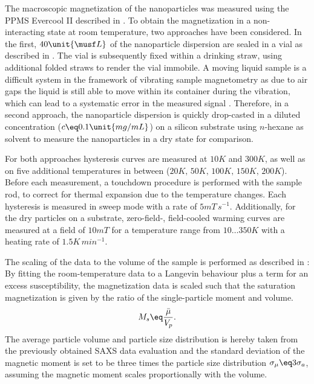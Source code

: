 \documentclass[\main/dresen_thesis.tex]{subfiles}
\begin{document}
    The macroscopic magnetization of the nanoparticles was measured using the PPMS Evercool II described in .
    To obtain the magnetization in a non-interacting state at room temperature, two approaches have been considered.
    In the first, $40 \unit{\musf L}$ of the nanoparticle dispersion are sealed in a vial as described in .
    The vial is subsequently fixed within a drinking straw, using additional folded straws to render the vial immobile.
    A moving liquid sample is a difficult system in the framework of vibrating sample magnetometry as due to air gaps the liquid is still able to move within its container during the vibration, which can lead to a systematic error in the measured signal \cite{Boekelheide_2016_Artif}.
    Therefore, in a second approach, the nanoparticle dispersion is quickly drop-casted in a diluted concentration ($c \eq 0.1 \unit{mg/mL}$) on a silicon substrate using $\textit{n}$-hexane as solvent to measure the nanoparticles in a dry state for comparison.

    For both approaches hysteresis curves are measured at $10 \unit{K}$ and $300 \unit{K}$, as well as on five additional temperatures in between ($20\unit{K},\,50\unit{K},\,100\unit{K},\,150\unit{K},\,200\unit{K}$).
    Before each measurement, a touchdown procedure is performed with the sample rod, to correct for thermal expansion due to the temperature changes.
    Each hysteresis is measured in sweep mode with a rate of $5 \unit{mT \, s^{-1}}$.
    Additionally, for the dry particles on a substrate, zero-field-, field-cooled warming curves are measured at a field of $10 \unit{mT}$ for a temperature range from $10 \ldots 350 \unit{K}$ with a heating rate of $1.5 \unit{K \, min^{-1}}$.

    The scaling of the data to the volume of the sample is performed as described in :
    By fitting the room-temperature data to a Langevin behaviour plus a term for an excess susceptibility, the magnetization data is scaled such that the saturation magnetization is given by the ratio of the single-particle moment and volume.
    \begin{align}
      M_s \eq \frac{\bar{\mu}}{V_p}.
    \end{align}
    The average particle volume and particle size distribution is hereby taken from the previously obtained SAXS data evaluation and the standard deviation of the magnetic moment is set to be three times the particle size distribution $\sigma_\mu \eq 3 \sigma_a$, assuming the magnetic moment scales proportionally with the volume.
\end{document}
